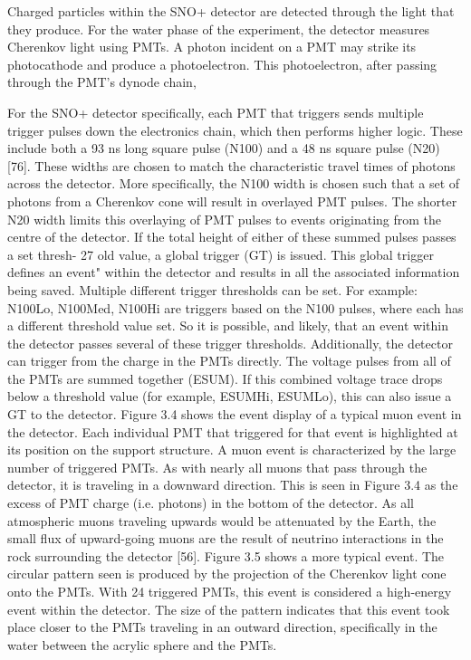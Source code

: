 Charged particles within the SNO+ detector are detected through the light that
they produce. For the water phase of the experiment, the detector measures
Cherenkov light using PMTs. A photon incident on a PMT may strike its
photocathode and produce a photoelectron. This photoelectron, after passing
through the PMT’s dynode chain,

For the SNO+ detector specifically, each PMT that triggers sends multiple
trigger pulses down the electronics chain, which then performs higher logic.
These include both a 93 ns long square pulse (N100) and a 48 ns square pulse
(N20) [76]. These widths are chosen to match the characteristic travel times
of photons across the detector. More specifically, the N100 width is chosen
such that a set of photons from a Cherenkov cone will result in overlayed PMT
pulses. The shorter N20 width limits this overlaying of PMT pulses to events
originating from the centre of the detector.
If the total height of either of these summed pulses passes a set thresh-
27
old value, a global trigger (GT) is issued. This global trigger defines an
event" within the detector and results in all the associated information being
saved. Multiple different trigger thresholds can be set. For example: N100Lo,
N100Med, N100Hi are triggers based on the N100 pulses, where each has a
different threshold value set. So it is possible, and likely, that an event within
the detector passes several of these trigger thresholds.
Additionally, the detector can trigger from the charge in the PMTs directly.
The voltage pulses from all of the PMTs are summed together (ESUM). If this
combined voltage trace drops below a threshold value (for example, ESUMHi,
ESUMLo), this can also issue a GT to the detector.
Figure 3.4 shows the event display of a typical muon event in the detector. Each individual PMT that triggered for that event is highlighted at its
position on the support structure. A muon event is characterized by the large
number of triggered PMTs. As with nearly all muons that pass through the
detector, it is traveling in a downward direction. This is seen in Figure 3.4 as
the excess of PMT charge (i.e. photons) in the bottom of the detector. As all
atmospheric muons traveling upwards would be attenuated by the Earth, the
small flux of upward-going muons are the result of neutrino interactions in the
rock surrounding the detector [56].
Figure 3.5 shows a more typical event. The circular pattern seen is produced
by the projection of the Cherenkov light cone onto the PMTs. With 24 triggered
PMTs, this event is considered a high-energy event within the detector. The
size of the pattern indicates that this event took place closer to the PMTs
traveling in an outward direction, specifically in the water between the acrylic
sphere and the PMTs.




